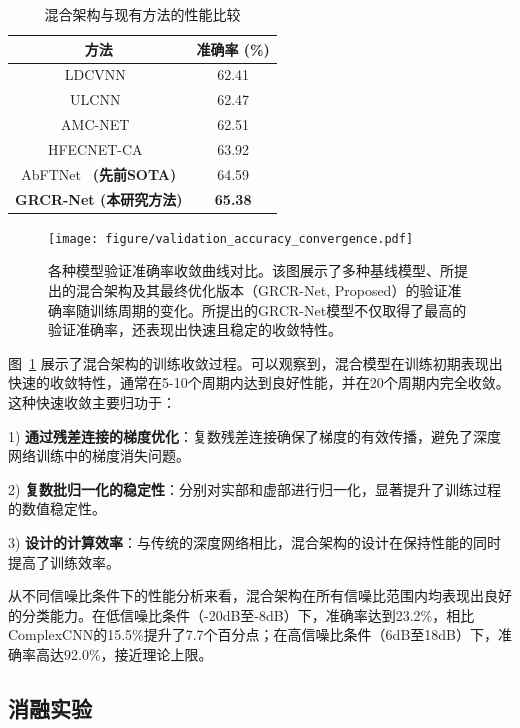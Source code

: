 \documentclass[conference]{IEEEtran}
\begin{document}
\begin{table}[!htbp]
\centering
\caption{混合架构与现有方法的性能比较}
\label{tab:hybrid_performance}
\begin{tabular}{@{}cc@{}}
\toprule
方法 & 准确率 (\%) \\
\midrule
LDCVNN~\cite{xu2025ldcvnn} & 62.41 \\
ULCNN~\cite{guo2024ulcnn} & 62.47 \\
AMC-NET~\cite{zhang2023amcnet} & 62.51 \\
HFECNET-CA~\cite{ma2023hfecnetca} & 63.92 \\
AbFTNet~\cite{ning2024abftnet} \textbf{(先前SOTA)} & 64.59 \\
\textbf{GRCR-Net (本研究方法)} & \textbf{65.38} \\
\bottomrule
\end{tabular}
\end{table}

\begin{figure}[htbp]
\centering
\texttt{[image: figure/validation\_accuracy\_convergence.pdf]}
\caption{各种模型验证准确率收敛曲线对比。该图展示了多种基线模型、所提出的混合架构及其最终优化版本（GRCR-Net, Proposed）的验证准确率随训练周期的变化。所提出的GRCR-Net模型不仅取得了最高的验证准确率，还表现出快速且稳定的收敛特性。}
\label{fig:training_convergence}
\end{figure}

图~\ref{fig:training_convergence} 展示了混合架构的训练收敛过程。可以观察到，混合模型在训练初期表现出快速的收敛特性，通常在5-10个周期内达到良好性能，并在20个周期内完全收敛。这种快速收敛主要归功于：

1) \textbf{通过残差连接的梯度优化}：复数残差连接确保了梯度的有效传播，避免了深度网络训练中的梯度消失问题。

2) \textbf{复数批归一化的稳定性}：分别对实部和虚部进行归一化，显著提升了训练过程的数值稳定性。

3) \textbf{设计的计算效率}：与传统的深度网络相比，混合架构的设计在保持性能的同时提高了训练效率。

从不同信噪比条件下的性能分析来看，混合架构在所有信噪比范围内均表现出良好的分类能力。在低信噪比条件（-20dB至-8dB）下，准确率达到23.2\%，相比ComplexCNN的15.5\%提升了7.7个百分点；在高信噪比条件（6dB至18dB）下，准确率高达92.0\%，接近理论上限。

\subsection{消融实验}
\end{document}
